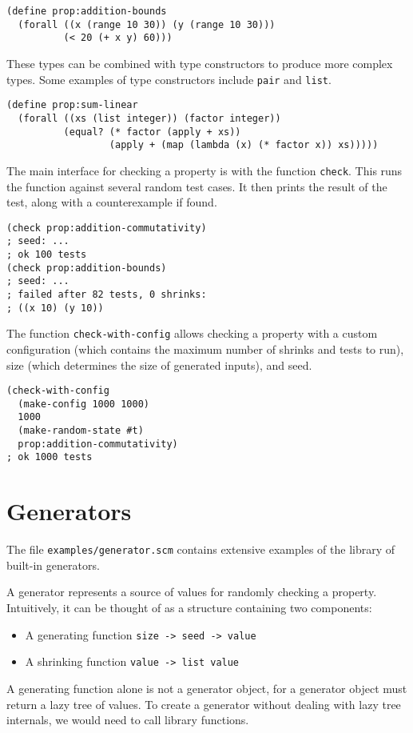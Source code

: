 \documentclass{scrartcl}
\begin{document}
\begin{verbatim}
(define prop:addition-bounds
  (forall ((x (range 10 30)) (y (range 10 30)))
          (< 20 (+ x y) 60)))
\end{verbatim}

These types can be combined with type constructors to produce more complex
types. Some examples of type constructors include \verb|pair| and \verb|list|.

\begin{verbatim}
(define prop:sum-linear
  (forall ((xs (list integer)) (factor integer))
          (equal? (* factor (apply + xs))
                  (apply + (map (lambda (x) (* factor x)) xs)))))
\end{verbatim}

The main interface for checking a property is with the function \verb|check|.
This runs the function against several random test cases. It then prints
the result of the test, along with a counterexample if found.

\begin{verbatim}
(check prop:addition-commutativity)
; seed: ...
; ok 100 tests
(check prop:addition-bounds)
; seed: ...
; failed after 82 tests, 0 shrinks:
; ((x 10) (y 10))
\end{verbatim}

The function \verb|check-with-config| allows checking a property with a custom
configuration (which contains the maximum number of shrinks and tests to run),
size (which determines the size of generated inputs), and seed.

\begin{verbatim}
(check-with-config
  (make-config 1000 1000)
  1000
  (make-random-state #t)
  prop:addition-commutativity)
; ok 1000 tests
\end{verbatim}

\section{Generators}

The file \verb|examples/generator.scm| contains extensive examples of the
library of built-in generators.

A generator represents a source of values for randomly checking a property.
Intuitively, it can be thought of as a structure containing two components:
\begin{itemize}
\item A generating function \verb|size -> seed -> value|
\item A shrinking function \verb|value -> list value|
\end{itemize}
A generating function alone is not a generator object, for a generator object
must return a lazy tree of values. To create a generator without dealing with
lazy tree internals, we would need to call library functions.
\end{document}
